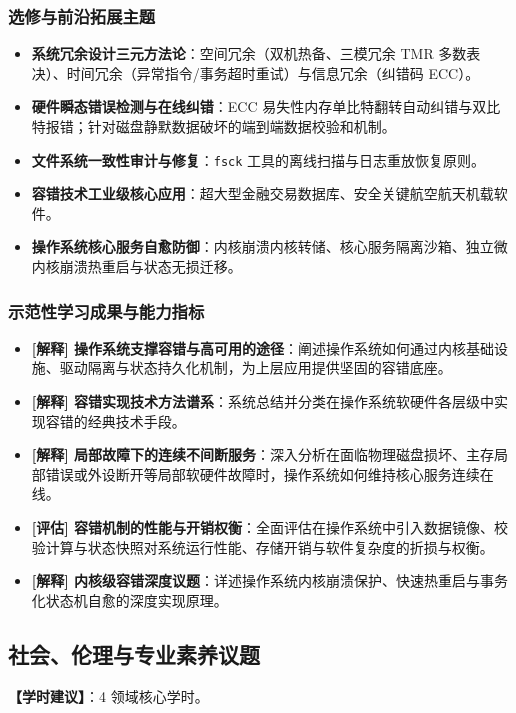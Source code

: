 \subsubsection{选修与前沿拓展主题}
\begin{itemize}\setlength{\itemsep}{0pt}\setlength{\parskip}{0pt}
    \item \textbf{系统冗余设计三元方法论}：空间冗余（双机热备、三模冗余 TMR 多数表决）、时间冗余（异常指令/事务超时重试）与信息冗余（纠错码 ECC）。
    \item \textbf{硬件瞬态错误检测与在线纠错}：ECC 易失性内存单比特翻转自动纠错与双比特报错；针对磁盘静默数据破坏的端到端数据校验和机制。
    \item \textbf{文件系统一致性审计与修复}：\texttt{fsck} 工具的离线扫描与日志重放恢复原则。
    \item \textbf{容错技术工业级核心应用}：超大型金融交易数据库、安全关键航空航天机载软件。
    \item \textbf{操作系统核心服务自愈防御}：内核崩溃内核转储、核心服务隔离沙箱、独立微内核崩溃热重启与状态无损迁移。
\end{itemize}

\subsubsection{示范性学习成果与能力指标}
\begin{itemize}\setlength{\itemsep}{0pt}\setlength{\parskip}{0pt}
    \item \textbf{[解释] 操作系统支撑容错与高可用的途径}：阐述操作系统如何通过内核基础设施、驱动隔离与状态持久化机制，为上层应用提供坚固的容错底座。
    \item \textbf{[解释] 容错实现技术方法谱系}：系统总结并分类在操作系统软硬件各层级中实现容错的经典技术手段。
    \item \textbf{[解释] 局部故障下的连续不间断服务}：深入分析在面临物理磁盘损坏、主存局部错误或外设断开等局部软硬件故障时，操作系统如何维持核心服务连续在线。
    \item \textbf{[评估] 容错机制的性能与开销权衡}：全面评估在操作系统中引入数据镜像、校验计算与状态快照对系统运行性能、存储开销与软件复杂度的折损与权衡。
    \item \textbf{[解释] 内核级容错深度议题}：详述操作系统内核崩溃保护、快速热重启与事务化状态机自愈的深度实现原理。
\end{itemize}

\subsection{社会、伦理与专业素养议题}
\textbf{【学时建议】}：4 领域核心学时。

